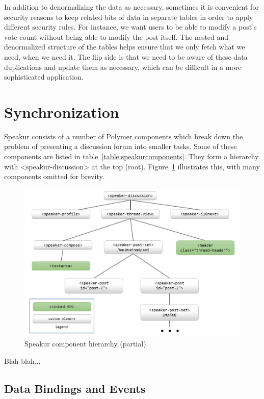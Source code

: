 In addition to denormalizing the data as necessary, sometimes it is convenient for security reasons to 
keep related bits of data in separate tables in order to apply different security rules.
For instance, we want users to be able to modify a post's vote count without being able to modify the post itself.
The nested and denormalized structure of the tables helps ensure that we only fetch what we need, when we need it.
The flip side is that we need to be aware of these data duplications and update them as necessary, 
which can be difficult in a more sophisticated application.

\section{Synchronization}
\label{sec:sync}

Speakur consists of a number of Polymer components which break down the problem of presenting a discussion forum into smaller tasks.
Some of these components are listed in table~\ref{table:speakurcomponents}.
They form a hierarchy with <speakur-discussion> at the top (root). 
Figure~\ref{f:component_layout} illustrates this, with many components omitted for brevity.

\begin{figure}[htb]
	\centerline{\includegraphics[width=6.2in]{images/components.png}}
	\caption{Speakur component hierarchy (partial).}
	\label{f:component_layout}
\end{figure}

Blah blah...


\subsection{Data Bindings and Events}
\label{sec:databindings}

